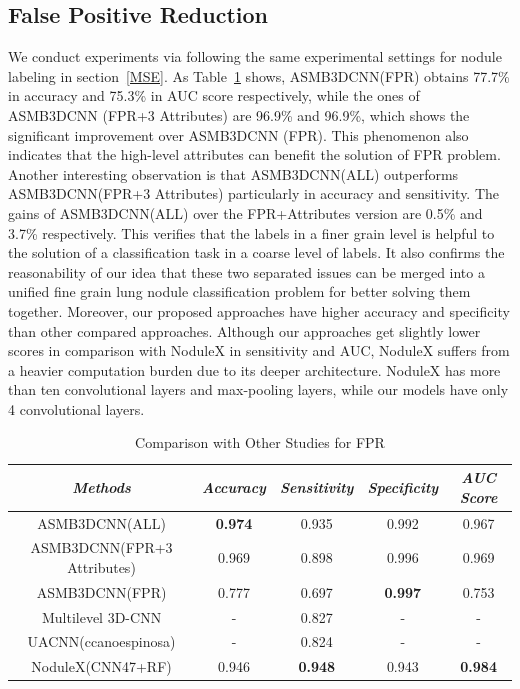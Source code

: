 \documentclass[runningheads]{llncs}
\begin{document}
\subsection{False Positive Reduction}
\label{FPR}
We conduct experiments via following the same experimental settings for nodule labeling in section~\ref{MSE}. As Table~\ref{tab5} shows, ASMB3DCNN(FPR) obtains 77.7\% in accuracy and 75.3\% in AUC score respectively, while the ones of ASMB3DCNN (FPR+3 Attributes) are 96.9\% and 96.9\%, which shows the significant improvement over ASMB3DCNN (FPR). This phenomenon also indicates that the high-level attributes can benefit the solution of FPR problem. Another interesting observation is that ASMB3DCNN(ALL) outperforms ASMB3DCNN(FPR+3 Attributes) particularly in accuracy and sensitivity. The gains of ASMB3DCNN(ALL) over the FPR+Attributes version are 0.5\% and 3.7\% respectively. This verifies that the labels in a finer grain level is helpful to the solution of a classification task in a coarse level of labels. It also confirms the reasonability of our idea that these two separated issues can be merged into a unified fine grain lung nodule classification problem for better solving them together. Moreover, our proposed approaches have higher accuracy and specificity than other compared approaches. Although our approaches get slightly lower scores in comparison with NoduleX in sensitivity and AUC, NoduleX suffers from a heavier computation burden due to its deeper architecture. NoduleX has more than ten convolutional layers and max-pooling layers, while our models have only 4 convolutional layers.


\begin{table}[htb]
\vspace{-0.5cm}
\caption{Comparison with Other Studies for FPR}
\begin{center}
\begin{tabular}{|c|c|c|c|c|}
\hline
\textbf{\textit{Methods}} & \textbf{\textit{Accuracy}} & \textbf{\textit{Sensitivity}}& \textbf{\textit{Specificity}} & \textbf{\textit{AUC Score}} \\
\hline
ASMB3DCNN(ALL)  & {\bfseries 0.974} & 0.935 &0.992 & 0.967 \\
ASMB3DCNN(FPR+3 Attributes)  &0.969 & 0.898 & 0.996 &0.969 \\
ASMB3DCNN(FPR) &0.777  & 0.697 & {\bfseries 0.997} &0.753 \\
Multilevel 3D-CNN\cite{Qi2016Multilevel} &- & 0.827 &-&-\\
UACNN(ccanoespinosa) &- &0.824 &-&- \\
NoduleX(CNN47+RF)\cite{Causey2018Highly} &0.946 & {\bfseries 0.948} & 0.943 & {\bfseries 0.984} \\
\hline

\end{tabular}
\label{tab5}
\vspace{-1cm}
\end{center}
\vspace{-0.5cm}
\end{table}
\end{document}

